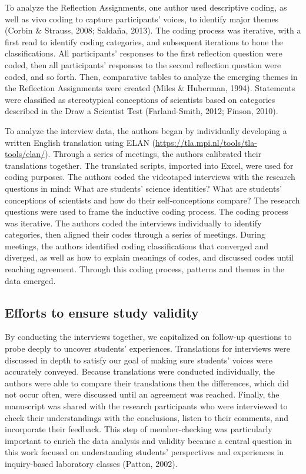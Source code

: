\documentclass[11.5pt]{sig-alternate} %
\begin{document}
\begin{large}
To analyze the Reflection Assignments, one author used descriptive coding, as well as vivo coding to capture participants’ voices, to identify major themes (Corbin \& Strauss, 2008; Saldaña, 2013). The coding process was iterative, with a first read to identify coding categories, and subsequent iterations to hone the classifications. All participants’ responses to the first reflection question were coded, then all participants’ responses to the second reflection question were coded, and so forth. Then, comparative tables to analyze the emerging themes in the Reflection Assignments were created (Miles \& Huberman, 1994). Statements were classified as stereotypical conceptions of scientists based on categories described in the Draw a Scientist Test (Farland-Smith, 2012; Finson, 2010). 

To analyze the interview data, the authors began by individually developing a written English translation using ELAN (\url{https://tla.mpi.nl/tools/tla-tools/elan/}). Through a series of meetings, the authors calibrated their translations together. The translated scripts, imported into Excel, were used for coding purposes. The authors coded the videotaped interviews with the research questions in mind: What are students’ science identities? What are students’ conceptions of scientists and how do their self-conceptions compare? The research questions were used to frame the inductive coding process. The coding process was iterative. The authors coded the interviews individually to identify categories, then aligned their codes through a series of meetings. During meetings, the authors identified coding classifications that converged and diverged, as well as how to explain meanings of codes, and discussed codes until reaching agreement. Through this coding process, patterns and themes in the data emerged. 

\subsection*{Efforts to ensure study validity}

By conducting the interviews together, we capitalized on follow-up questions to probe deeply to uncover students’ experiences. Translations for interviews were discussed in depth to satisfy our goal of making sure students’ voices were accurately conveyed. Because translations were conducted individually, the authors were able to compare their translations then the differences, which did not occur often, were discussed until an agreement was reached. Finally, the manuscript was shared with the research participants who were interviewed to check their understandings with the conclusions, listen to their comments, and incorporate their feedback. This step of member-checking was particularly important to enrich the data analysis and validity because a central question in this work focused on understanding students’ perspectives and experiences in inquiry-based laboratory classes (Patton, 2002). 


\end{large}
\end{document}
